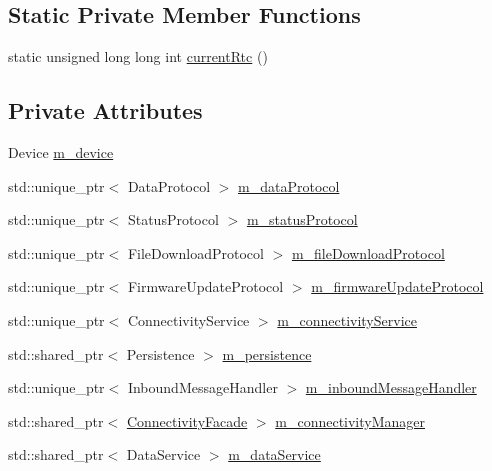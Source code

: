 \subsection*{Static Private Member Functions}
\begin{DoxyCompactItemize}
\item 
static unsigned long long int \hyperlink{classwolkabout_1_1_wolk_af089e5381e328eea215a99164062b1ef}{current\+Rtc} ()
\end{DoxyCompactItemize}
\subsection*{Private Attributes}
\begin{DoxyCompactItemize}
\item 
Device \hyperlink{classwolkabout_1_1_wolk_a693a46fb484c06e1bf8ac771995420ef}{m\+\_\+device}
\item 
std\+::unique\+\_\+ptr$<$ Data\+Protocol $>$ \hyperlink{classwolkabout_1_1_wolk_a7a8acc5345a3d6fd3b7e92dca9d4649c}{m\+\_\+data\+Protocol}
\item 
std\+::unique\+\_\+ptr$<$ Status\+Protocol $>$ \hyperlink{classwolkabout_1_1_wolk_ab410d711778fd39cba66ebac0c6d1929}{m\+\_\+status\+Protocol}
\item 
std\+::unique\+\_\+ptr$<$ File\+Download\+Protocol $>$ \hyperlink{classwolkabout_1_1_wolk_a0cc964d56e1f921a29b99448c4b6af64}{m\+\_\+file\+Download\+Protocol}
\item 
std\+::unique\+\_\+ptr$<$ Firmware\+Update\+Protocol $>$ \hyperlink{classwolkabout_1_1_wolk_a7b180b579e0bdc7dd0d076c00feb886f}{m\+\_\+firmware\+Update\+Protocol}
\item 
std\+::unique\+\_\+ptr$<$ Connectivity\+Service $>$ \hyperlink{classwolkabout_1_1_wolk_a3b3f8b196063ea4808b7a374b225d97b}{m\+\_\+connectivity\+Service}
\item 
std\+::shared\+\_\+ptr$<$ Persistence $>$ \hyperlink{classwolkabout_1_1_wolk_a648fe96503a4f17efe4a6904d995633c}{m\+\_\+persistence}
\item 
std\+::unique\+\_\+ptr$<$ Inbound\+Message\+Handler $>$ \hyperlink{classwolkabout_1_1_wolk_a968a3f3c38c437876989c747d23d4c68}{m\+\_\+inbound\+Message\+Handler}
\item 
std\+::shared\+\_\+ptr$<$ \hyperlink{classwolkabout_1_1_wolk_1_1_connectivity_facade}{Connectivity\+Facade} $>$ \hyperlink{classwolkabout_1_1_wolk_a7f90b6701319c6a12d4519679e18f730}{m\+\_\+connectivity\+Manager}
\item 
std\+::shared\+\_\+ptr$<$ Data\+Service $>$ \hyperlink{classwolkabout_1_1_wolk_ae9dd0455d678445224ebbb7e73985577}{m\+\_\+data\+Service}

\end{DoxyCompactItemize}
